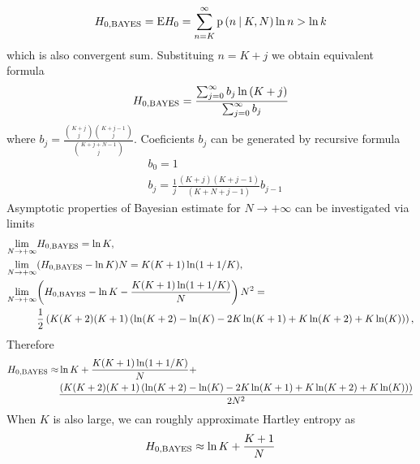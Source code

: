 \documentclass[a4paper,10pt]{article}
\begin{document}
\begin{equation} 
\label{eq:hnbayes}
H_{0,\mbox{\scriptsize{BAYES}}} = \text{E}H_{0} = \sum_{n=K}^{\infty}{\text{p}\left(n \: \middle| \: K,N\right)\ln{n}} > \ln{k}
\end{equation}
which is also convergent sum. Substituing $n=K+j$ we obtain equivalent formula
\begin{equation} 
\label{eq:hnbayesb}
H_{0,\mbox{\scriptsize{BAYES}}} = \frac{\sum_{j=0}^{\infty}{b_{j}\ln{(K+j)}}}{\sum_{j=0}^{\infty}{b_j}}
\end{equation}
where $b_{j}=\frac{{K+j \choose j}{K+j-1 \choose j}}{{K+j+N-1 \choose j}}$. Coeficients $b_{j}$ can be generated by recursive formula
\begin{equation} 
\label{eq:breform}
\begin{split}
& b_{0} = 1 \\
& b_{j} = \frac{1}{j} \frac{(K+j)(K+j-1)}{(K+N+j-1)} b_{j-1}
\end{split}
\end{equation}
Asymptotic properties of Bayesian estimate for $N \rightarrow +\infty$ can be investigated via limits
\begin{equation} 
\label{eq:lim}
\begin{split}
\lim_{N \rightarrow +\infty} & {H_{0,\mbox{\scriptsize{BAYES}}}} = \ln{K}, \\
\lim_{N \rightarrow +\infty} & {(H_{0,\mbox{\scriptsize{BAYES}}}-\ln{K})N} = K(K+1)\ln(1+1/K), \\
\lim_{N \rightarrow +\infty} & {\left(H_{0,\mbox{\scriptsize{BAYES}}}-\ln{K}-\frac{K(K+1)\ln(1+1/K)}{N}\right)N^2} = \\
& \frac{1}{2}\left(K(K+2)(K+1)\left(\ln(K+2)-\ln(K)-2K\ln(K+1)+K\ln(K+2)+K\ln(K)\right)\right),
\end{split}
\end{equation}
Therefore
\begin{equation} 
\label{eq:hroz}
\begin{split}
H_{0,\mbox{\scriptsize{BAYES}}} \approx & \ln{K} + \frac{K(K+1)\ln(1+1/K)}{N} + \\ 
& \frac{\left(K(K+2)(K+1)\left(\ln(K+2)-\ln(K)-2K\ln(K+1)+K\ln(K+2)+K\ln(K)\right)\right)}{2N^2}
\end{split}
\end{equation}
When $K$ is also large, we can roughly approximate Hartley entropy as
\begin{equation} 
\label{eq:hartapp}
H_{0,\mbox{\scriptsize{BAYES}}} \approx \ln{K} + \frac{K+1}{N}
\end{equation}
\end{document}
